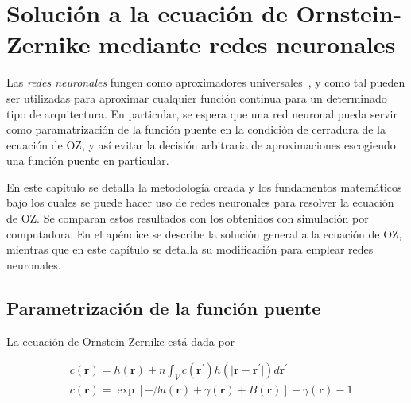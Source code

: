 \newcommand{\vecr}{\mathbf{r}}
\chapter{Solución a la ecuación de Ornstein-Zernike mediante redes neuronales} %

\label{Cap3} %


Las \emph{redes neuronales} fungen como aproximadores universales~\cite{hornikMultilayerFeedforwardNetworks1989, hornikApproximationCapabilitiesMultilayer1991, cybenkoApproximationSuperpositionsSigmoidal1989},
y como tal pueden ser utilizadas para aproximar cualquier función continua para un determinado tipo de arquitectura.
En particular, se espera que una red neuronal pueda servir como paramatrización de la
función puente en la condición de cerradura de la ecuación de OZ, y así evitar la decisión
arbitraria de aproximaciones escogiendo una función puente en particular.

En este capítulo se detalla la metodología creada y los fundamentos matemáticos bajo los
cuales se puede hacer uso de redes neuronales para resolver la ecuación de OZ.
Se comparan estos resultados con los obtenidos con simulación por computadora.
En el apéndice se describe la solución general a la ecuación de OZ, mientras que
en este capítulo se detalla su modificación para emplear redes neuronales.

\section{Parametrización de la función puente}

La ecuación de Ornstein-Zernike está dada por

\begin{subequations}
    \begin{align*}
         & c(\vecr) = h(\vecr) +
        n \int_{V}
        c(\vecr^{\prime})
        h(\lvert \vecr - \vecr^{\prime} \rvert)
        d\vecr^{\prime} \label{eq:oz1} \\
         & c(\vecr)
        = \exp{\left[
                -  \beta u(\vecr)
                +  \gamma(\vecr)
                + B(\vecr)
                \right]} -
        \gamma(\vecr)
        - 1
    \end{align*}
\end{subequations}

